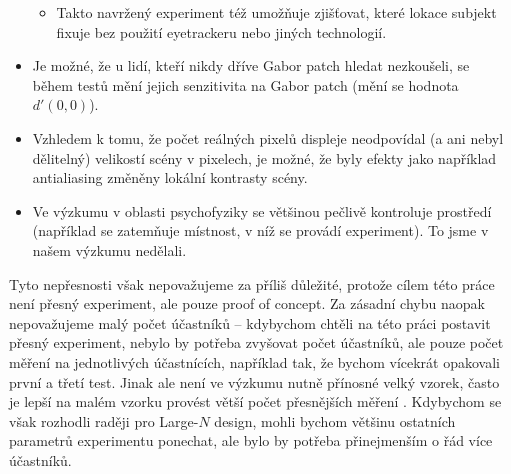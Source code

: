 \begin{itemize}
\begin{itemize}
\item Takto navržený experiment též umožňuje zjišťovat, které lokace subjekt
fixuje bez použití eyetrackeru nebo jiných technologií.

\end{itemize}

\item Je možné, že u lidí, kteří nikdy dříve Gabor patch hledat nezkoušeli, se
během testů mění jejich senzitivita na Gabor patch (mění se hodnota $d'(0,0)$).

\item Vzhledem k tomu, že počet reálných pixelů displeje neodpovídal (a ani
nebyl dělitelný) velikostí scény v pixelech, je možné, že byly efekty jako
například antialiasing změněny lokální kontrasty scény.

\item Ve výzkumu v oblasti psychofyziky se většinou
pečlivě kontroluje prostředí (například se zatemňuje místnost, v níž se provádí experiment). To jsme v našem výzkumu nedělali.

\end{itemize}

Tyto nepřesnosti však nepovažujeme za příliš důležité, protože cílem této práce
není přesný experiment, ale pouze proof of concept. Za zásadní chybu naopak
nepovažujeme malý počet účastníků -- kdybychom chtěli na této práci postavit
přesný experiment, nebylo by potřeba zvyšovat počet účastníků, ale pouze počet
měření na jednotlivých účastnících, například tak, že bychom vícekrát opakovali
první a třetí test. Jinak ale není ve výzkumu nutně přínosné velký vzorek,
často je lepší na malém vzorku provést větší počet přesnějších měření
\citep{SmallN}. Kdybychom se však rozhodli raději pro Large-$N$ design, mohli
bychom většinu ostatních parametrů experimentu ponechat, ale bylo by potřeba
přinejmenším o řád více účastníků. 


